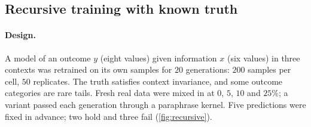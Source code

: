\documentclass[11pt]{article}
\theoremstyle{definition}
\theoremstyle{remark}
\begin{document}
\subsection{Recursive training with known truth}\label{sec:recursive}

\paragraph{Design.} A model of an outcome $y$ (eight values) given information $x$ (six values) in three contexts was retrained on its
own samples for $20$ generations: $200$ samples per cell, $50$ replicates. The truth satisfies context invariance, and some outcome
categories are rare tails. Fresh real data were mixed in at $0$, $5$, $10$ and $25\%$; a variant passed each generation through a
paraphrase kernel. Five predictions were fixed in advance; two hold and three fail (\cref{fig:recursive}).
\end{document}
